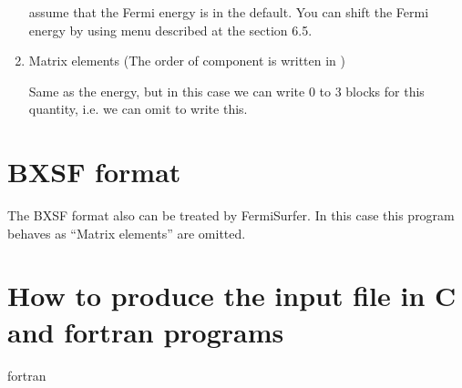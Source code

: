 \documentclass[letterpaper,10pt,pdftex,openany,english]{sphinxmanual}
\begin{document}
\begin{enumerate}
\sphinxAtStartPar
{} assume that the Fermi energy is  in the
default. You can shift the Fermi energy by using
 menu described at the section 6.5.

\item {} 
\sphinxAtStartPar
Matrix elements (The order of component is written in  {\hyperref[\detokenize{input:format}]{}} )

\sphinxAtStartPar
Same as the energy, but in this case we can
write 0 to 3 blocks for this quantity, i.e.
we can omit to write this.

\end{enumerate}


\section{BXSF format}
\label{\detokenize{input:bxsf-format}}
\sphinxAtStartPar
The BXSF format also can be treated by FermiSurfer.
In this case this program behaves as “Matrix elements” are omitted.


\section{How to produce the input file in C and fortran programs}
\label{\detokenize{input:how-to-produce-the-input-file-in-c-and-fortran-programs}}\label{\detokenize{input:format}}
\sphinxAtStartPar
fortran
\end{document}
